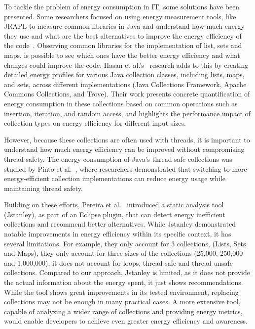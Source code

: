 To tackle the problem of energy consumption in IT, some solutions have been presented. Some researchers focused on using energy measurement tools, like JRAPL to measure common libraries in Java and understand how much energy they use and what are the best alternatives to improve the energy efficiency of the code~\cite{10.1145/2896967.2896968}. Observing common libraries for the implementation of list, sets and maps, is possible to see which ones have the better energy efficiency and what changes could improve the code.
Hasan et al.'s~\cite{10.1145/2884781.2884869} research adds to this by creating detailed energy profiles for various Java collection classes, including lists, maps, and sets, across different implementations (Java Collections Framework, Apache Commons Collections, and Trove). Their work presents concrete quantification of energy consumption in these collections based on common operations such as insertion, iteration, and random access, and highlights the performance impact of collection types on energy efficiency for different input sizes.

However, because these collections are often used with threads, it is important to understand how much energy efficiency can be improved without compromising thread safety. The energy consumption of Java's thread-safe collections was studied by Pinto et al.~\cite{7816451}, where researchers demonstrated that switching to more energy-efficient collection implementations can reduce energy usage while maintaining thread safety.

Building on these efforts, Pereira et al.~\cite{10.1145/3238147.3240473} introduced a static analysis tool (Jstanley), as part of an Eclipse plugin, that can detect energy inefficient collections and recommend better alternatives. While Jstanley demonstrated notable improvements in energy efficiency within its specific context, it has several limitations.
For example, they only account for 3 collections, (Lists, Sets and Maps), they only account for three sizes of the collections (25,000, 250,000 and 1,000,000), it does not account for loops, thread safe and thread unsafe collections. Compared to our approach, Jstanley is limited, as it does not provide the actual information about the energy spent, it just shows recommendations. While the tool shows great improvements in its tested environment, replacing collections may not be enough in many practical cases. A more extensive tool, capable of analyzing a wider range of collections and providing energy metrics, would enable developers to achieve even greater energy efficiency and awareness.

